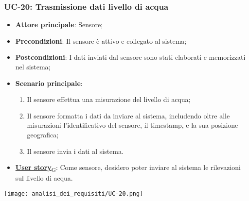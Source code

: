 \subsubsection{UC-20: Trasmissione dati livello di acqua}
\begin{itemize}
	\item \textbf{Attore principale}: Sensore;
	\item \textbf{Precondizioni}: Il sensore è attivo e collegato al sistema;
	\item \textbf{Postcondizioni}: I dati inviati dal sensore sono stati elaborati e memorizzati nel sistema;
	\item \textbf{Scenario principale}:
	      \begin{enumerate}
		      \item Il sensore effettua una misurazione del livello di acqua;
		      \item Il sensore formatta i dati da inviare al sistema, includendo oltre alle misurazioni l'identificativo del sensore,
		            il timestamp, e la sua posizione geografica;
		      \item Il sensore invia i dati al sistema.
	      \end{enumerate}
	\item \href{https://7last.github.io/docs/rtb/documentazione-interna/glossario\#user-story}{\textbf{User story}\textsubscript{G}}: Come sensore, desidero poter inviare al sistema le rilevazioni sul livello di acqua.
\end{itemize}

\begin{center}
	\texttt{[image: analisi\_dei\_requisiti/UC-20.png]}
\end{center}


